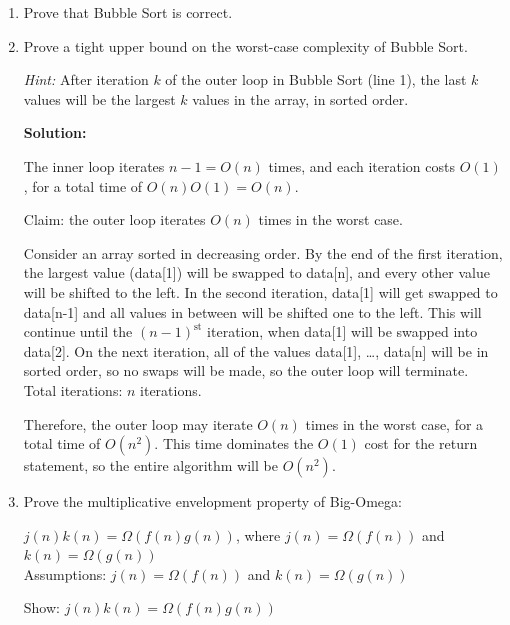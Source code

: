 \documentclass{article}
\begin{document}
\begin{enumerate}
\item Prove that Bubble Sort is correct.











\newpage
\item Prove a tight upper bound on the worst-case complexity of Bubble Sort.

\textit{Hint:}
After iteration $k$ of the outer loop in Bubble Sort (line 1),
the last $k$ values will be the largest $k$ values in the array,
in sorted order.

\textbf{Solution:}

The inner loop iterates $n - 1 = O(n)$ times, and each iteration costs $O(1)$, for a total time of $O(n)O(1) = O(n)$.  

Claim:  the outer loop iterates $O(n)$ times in the worst case.

Consider an array sorted in decreasing order.  By the end of the first iteration, the largest value (data[1]) will be swapped to data[n], and every other value will be shifted to the left.  In the second iteration, data[1] will get swapped to data[n-1] and all values in between will be shifted one to the left.  This will continue until the $(n-1)^\textrm{st}$ iteration, when data[1] will be swapped into data[2].  On the next iteration, all of the values data[1], \ldots, data[n] will be in sorted order, so no swaps will be made, so the outer loop will terminate.  Total iterations:  $n$ iterations.

Therefore, the outer loop may iterate $O(n)$ times in the worst case, for a total time of $O(n^2)$.  This time dominates the $O(1)$ cost for the return statement, so the entire algorithm will be $O(n^2)$.


\newpage
\item Prove the multiplicative envelopment property of Big-Omega:

$j(n)k(n) = \Omega(f(n)g(n))$, 
where $j(n) = \Omega(f(n))$ and $k(n) = \Omega(g(n))$
\\

Assumptions:  $j(n) = \Omega(f(n))$ and $k(n) = \Omega(g(n))$

Show:  $j(n)k(n) = \Omega(f(n)g(n))$


\end{enumerate}
\end{document}
